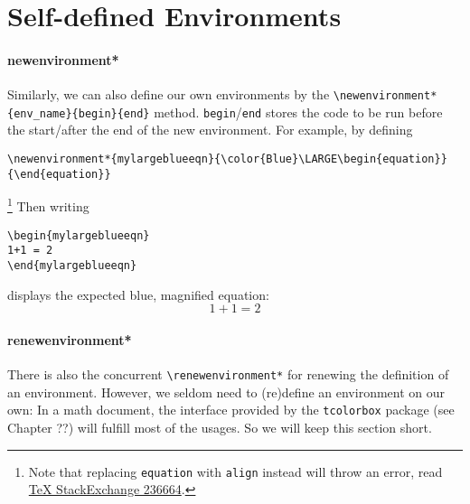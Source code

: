 \section{Self-defined Environments}

\paragraph{newenvironment*} Similarly, we can also define our own environments by the \texttt{\textbackslash newenvironment*\{env\_name\}\{begin\}\{end\}} method. \texttt{begin}/\texttt{end} stores the code to be run before the start/after the end of the new environment. For example, by defining
\begin{lstlisting}
\newenvironment*{mylargeblueeqn}{\color{Blue}\LARGE\begin{equation}}{\end{equation}}   
\end{lstlisting}
\newenvironment*{mylargeblueeqn}{\color{Blue}\LARGE\begin{equation}}{\end{equation}}   
\footnote{Note that replacing \texttt{equation} with \texttt{align} instead will throw an error, read \href{https://tex.stackexchange.com/questions/236664/newenvironment-error-with-beginalign-and-endalign}{\TeX{} StackExchange 236664}.} Then writing
\begin{lstlisting}
\begin{mylargeblueeqn}
1+1 = 2
\end{mylargeblueeqn}    
\end{lstlisting}
displays the expected blue, magnified equation:
\begin{mylargeblueeqn}
1+1 = 2
\end{mylargeblueeqn}

\paragraph{renewenvironment*} There is also the concurrent \texttt{\textbackslash renewenvironment*} for renewing the definition of an environment. However, we seldom need to (re)define an environment on our own: In a math document, the interface provided by the \texttt{tcolorbox} package (see Chapter ??) will fulfill most of the usages. So we will keep this section short.